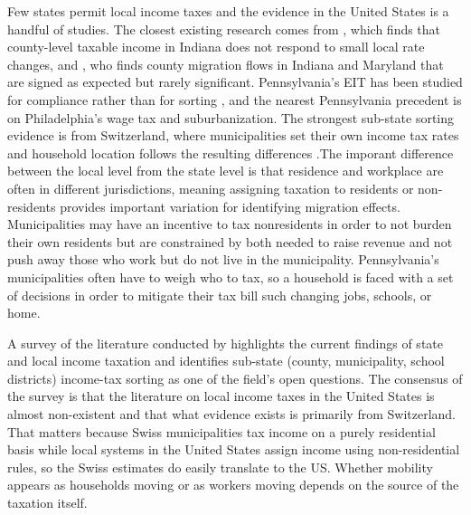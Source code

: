 \documentclass[12pt]{article}
\begin{document}
Few states permit local income taxes and the evidence in the United States is a handful of studies. The closest existing research comes from
\citet{yangRESPONSIVENESSINCOMELOCAL2017}, which finds that county-level taxable income in Indiana does not respond to small local rate changes, and \citet{yushkovLocalIncomeTaxes2025}, who finds county migration flows in Indiana and Maryland that are signed as expected but rarely significant. Pennsylvania's EIT has been studied for compliance rather than for sorting \citep{bagchiEffectsIntroducingWithholding2022}, and the nearest Pennsylvania precedent is \citet{livasLocalTaxesSuburbanization2026} on Philadelphia's wage tax and suburbanization. The strongest sub-state sorting evidence is from Switzerland, where municipalities set their own income tax rates and household location follows the resulting differences \citep{schmidheiny2006, schalteggerTaxCompetitionIncome2011, basten2017}.The imporant difference between the local level from the state level is that residence and workplace are often in different jurisdictions, meaning assigning taxation to residents or non-residents provides important variation for identifying migration effects. Municipalities may have an incentive to tax nonresidents in order to not burden their own residents but are constrained by both needed to raise revenue and not push away those who work but do not live in the municipality. Pennsylvania's municipalities often have to weigh who to tax, so a household is faced with a set of decisions in order to mitigate their tax bill such changing jobs, schools, or home.

A survey of the literature conducted by \citet{agrawalLessonsStateLocal} highlights the current findings of state and local income taxation and identifies sub-state (county, municipality, school districts) income-tax sorting as one of the field's open questions. The consensus of the survey is that the literature on local income taxes in the United States is almost non-existent and that what evidence exists is primarily from Switzerland. That matters because Swiss municipalities tax income on a purely residential basis while local systems in the United States assign income using non-residential rules, so the Swiss estimates do easily translate to the US. Whether mobility appears as households moving or as workers moving depends on the source of the taxation itself.
\end{document}
